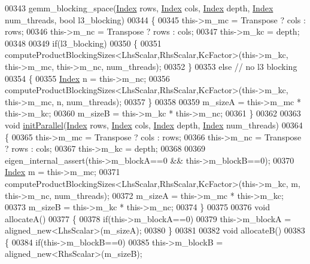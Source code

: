\begin{DoxyCode}
00343     gemm\_blocking\_space(\hyperlink{namespace_eigen_a62e77e0933482dafde8fe197d9a2cfde}{Index} rows, \hyperlink{namespace_eigen_a62e77e0933482dafde8fe197d9a2cfde}{Index} cols, \hyperlink{namespace_eigen_a62e77e0933482dafde8fe197d9a2cfde}{Index} depth, 
      \hyperlink{namespace_eigen_a62e77e0933482dafde8fe197d9a2cfde}{Index} num\_threads, \textcolor{keywordtype}{bool} l3\_blocking)
00344     \{
00345       this->m\_mc = Transpose ? cols : rows;
00346       this->m\_nc = Transpose ? rows : cols;
00347       this->m\_kc = depth;
00348 
00349       \textcolor{keywordflow}{if}(l3\_blocking)
00350       \{
00351         computeProductBlockingSizes<LhsScalar,RhsScalar,KcFactor>(this->m\_kc, this->m\_mc, this->m\_nc, 
      num\_threads);
00352       \}
00353       \textcolor{keywordflow}{else}  \textcolor{comment}{// no l3 blocking}
00354       \{
00355         \hyperlink{namespace_eigen_a62e77e0933482dafde8fe197d9a2cfde}{Index} n = this->m\_nc;
00356         computeProductBlockingSizes<LhsScalar,RhsScalar,KcFactor>(this->m\_kc, this->m\_mc, n, num\_threads);
00357       \}
00358 
00359       m\_sizeA = this->m\_mc * this->m\_kc;
00360       m\_sizeB = this->m\_kc * this->m\_nc;
00361     \}
00362 
00363     \textcolor{keywordtype}{void} \hyperlink{namespace_eigen_a820c0e0460934cc17eb6dacbad54a9f5}{initParallel}(\hyperlink{namespace_eigen_a62e77e0933482dafde8fe197d9a2cfde}{Index} rows, \hyperlink{namespace_eigen_a62e77e0933482dafde8fe197d9a2cfde}{Index} cols, \hyperlink{namespace_eigen_a62e77e0933482dafde8fe197d9a2cfde}{Index} depth, 
      \hyperlink{namespace_eigen_a62e77e0933482dafde8fe197d9a2cfde}{Index} num\_threads)
00364     \{
00365       this->m\_mc = Transpose ? cols : rows;
00366       this->m\_nc = Transpose ? rows : cols;
00367       this->m\_kc = depth;
00368 
00369       eigen\_internal\_assert(this->m\_blockA==0 && this->m\_blockB==0);
00370       \hyperlink{namespace_eigen_a62e77e0933482dafde8fe197d9a2cfde}{Index} m = this->m\_mc;
00371       computeProductBlockingSizes<LhsScalar,RhsScalar,KcFactor>(this->m\_kc, m, this->m\_nc, num\_threads);
00372       m\_sizeA = this->m\_mc * this->m\_kc;
00373       m\_sizeB = this->m\_kc * this->m\_nc;
00374     \}
00375 
00376     \textcolor{keywordtype}{void} allocateA()
00377     \{
00378       \textcolor{keywordflow}{if}(this->m\_blockA==0)
00379         this->m\_blockA = aligned\_new<LhsScalar>(m\_sizeA);
00380     \}
00381 
00382     \textcolor{keywordtype}{void} allocateB()
00383     \{
00384       \textcolor{keywordflow}{if}(this->m\_blockB==0)
00385         this->m\_blockB = aligned\_new<RhsScalar>(m\_sizeB);

\end{DoxyCode}
